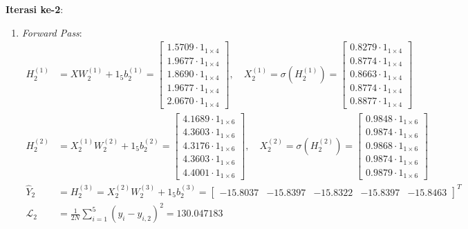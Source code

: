 \documentclass[11pt,a4paper]{article}
\def\mathbf#1{#1}%
\theoremstyle{plain}
\theoremstyle{definition}
\theoremstyle{remark}
\begin{document}
\noindent \textbf{Iterasi ke-2}:
\begin{enumerate}
    \item \textit{Forward Pass}:
    \begin{align}
        H^{(1)}_2 &= X W^{(1)}_2 + \mathbf{1}_5 \mathbf{b}^{(1)}_2 = \begin{bmatrix} 1.5709 \cdot \mathbf{1}_{1 \times 4} \\ 1.9677 \cdot \mathbf{1}_{1 \times 4} \\ 1.8690 \cdot \mathbf{1}_{1 \times 4} \\ 1.9677 \cdot \mathbf{1}_{1 \times 4} \\ 2.0670 \cdot \mathbf{1}_{1 \times 4} \end{bmatrix}, \quad
        X^{(1)}_2 = \sigma\!\left(H^{(1)}_2\right) = \begin{bmatrix} 0.8279 \cdot \mathbf{1}_{1 \times 4} \\ 0.8774 \cdot \mathbf{1}_{1 \times 4} \\ 0.8663 \cdot \mathbf{1}_{1 \times 4} \\ 0.8774 \cdot \mathbf{1}_{1 \times 4} \\ 0.8877 \cdot \mathbf{1}_{1 \times 4} \end{bmatrix} \\[0.2em]
        H^{(2)}_2 &= X^{(1)}_2 W^{(2)}_2 + \mathbf{1}_5 \mathbf{b}^{(2)}_2 = \begin{bmatrix} 4.1689 \cdot \mathbf{1}_{1 \times 6} \\ 4.3603 \cdot \mathbf{1}_{1 \times 6} \\ 4.3176 \cdot \mathbf{1}_{1 \times 6} \\ 4.3603 \cdot \mathbf{1}_{1 \times 6} \\ 4.4001 \cdot \mathbf{1}_{1 \times 6} \end{bmatrix}, \quad
        X^{(2)}_2 = \sigma\!\left(H^{(2)}_2\right) = \begin{bmatrix} 0.9848 \cdot \mathbf{1}_{1 \times 6} \\ 0.9874 \cdot \mathbf{1}_{1 \times 6} \\ 0.9868 \cdot \mathbf{1}_{1 \times 6} \\ 0.9874 \cdot \mathbf{1}_{1 \times 6} \\ 0.9879 \cdot \mathbf{1}_{1 \times 6} \end{bmatrix} \\[0.2em]
        \hat{Y}_2 &= H^{(3)}_2 = X^{(2)}_2 W^{(3)}_2 + \mathbf{1}_5 \mathbf{b}^{(3)}_2 = \begin{bmatrix} -15.8037 & -15.8397 & -15.8322 & -15.8397 & -15.8463 \end{bmatrix}^T \\[0.2em]
        \mathcal{L}_2 &= \frac{1}{2N} \sum_{i=1}^5 \left( y_i - \hat{y}_{i, 2} \right)^2 = 130.047183
    \end{align}


\end{enumerate}
\end{document}
